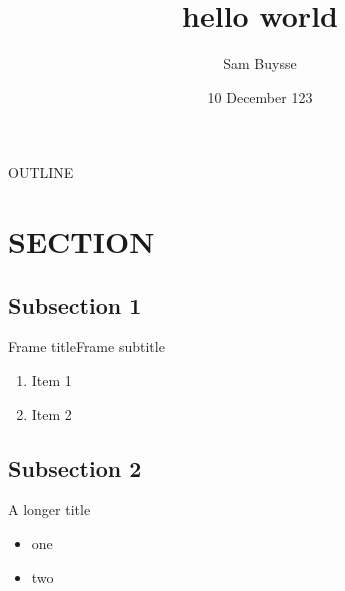 \documentclass[aspectratio=169]{beamer}
\title{hello world}
\date{10 December 123}
\author{Sam Buysse}
\begin{document}
\begin{frame}
    \titlepage
\end{frame}

\begin{frame}[plain]{OUTLINE}
    \addtocounter{framenumber}{-1}
    \tableofcontents
\end{frame}

\section{SECTION}
\begin{frame}[plain]
    \sectionpage
\end{frame}

\subsection{Subsection 1}
\begin{frame}{Frame title}{Frame subtitle}
    \begin{enumerate}
        \item Item 1
        \item Item 2
    \end{enumerate}
\end{frame}

\subsection{Subsection 2}
\begin{frame}{A longer title}
    \begin{itemize}
        \item one
        \item two
    \end{itemize}
\end{frame}

\begin{frame}[plain]
    \endcard
\end{frame}
\end{document}
